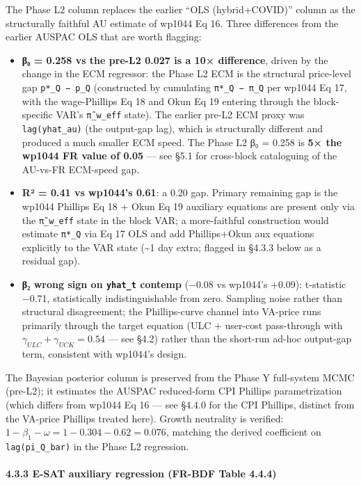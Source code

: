 \documentclass[
]{article}
\providecommand{\tightlist}{%
  \setlength{\itemsep}{0pt}\setlength{\parskip}{0pt}}
\begin{document}
The Phase L2 column replaces the earlier ``OLS (hybrid+COVID)'' column
as the structurally faithful AU estimate of wp1044 Eq 16. Three
differences from the earlier AUSPAC OLS that are worth flagging:

\begin{itemize}
\tightlist
\item
  \textbf{β₀ = 0.258 vs the pre-L2 0.027 is a 10× difference}, driven by
  the change in the ECM regressor: the Phase L2 ECM is the structural
  price-level gap \texttt{p*\_Q\ −\ p\_Q} (constructed by cumulating
  \texttt{π*\_Q\ −\ π\_Q} per wp1044 Eq 17, with the wage-Phillips Eq 18
  and Okun Eq 19 entering through the block-specific VAR's
  \texttt{π̃\_w\_eff} state). The earlier pre-L2 ECM proxy was
  \texttt{lag(yhat\_au)} (the output-gap lag), which is structurally
  different and produced a much smaller ECM speed. The Phase L2 β₀ =
  0.258 is \textbf{5× the wp1044 FR value of 0.05} --- see §5.1 for
  cross-block cataloguing of the AU-vs-FR ECM-speed gap.
\item
  \textbf{R² = 0.41 vs wp1044's 0.61}: a 0.20 gap. Primary remaining gap
  is the wp1044 Phillips Eq 18 + Okun Eq 19 auxiliary equations are
  present only via the \texttt{π̃\_w\_eff} state in the block VAR; a
  more-faithful construction would estimate \texttt{π*\_Q} via Eq 17 OLS
  and add Phillips+Okun aux equations explicitly to the VAR state
  (\textasciitilde1 day extra; flagged in §4.3.3 below as a residual
  gap).
\item
  \textbf{β₂ wrong sign on \texttt{yhat\_t} contemp} (−0.08 vs wp1044's
  +0.09): t-statistic −0.71, statistically indistinguishable from zero.
  Sampling noise rather than structural disagreement; the Phillips-curve
  channel into VA-price runs primarily through the target equation (ULC
  + user-cost pass-through with \(\gamma_{ULC} + \gamma_{UCK} = 0.54\)
  --- see §4.2) rather than the short-run ad-hoc output-gap term,
  consistent with wp1044's design.
\end{itemize}

The Bayesian posterior column is preserved from the Phase Y full-system
MCMC (pre-L2); it estimates the AUSPAC reduced-form CPI Phillips
parametrization (which differs from wp1044 Eq 16 --- see §4.4.0 for the
CPI Phillips, distinct from the VA-price Phillips treated here). Growth
neutrality is verified:
\(1 - \beta_1 - \omega = 1 - 0.304 - 0.62 = 0.076\), matching the
derived coefficient on \texttt{lag(pi\_Q\_bar)} in the Phase L2
regression.

\paragraph{4.3.3 E-SAT auxiliary regression (FR-BDF Table
4.4.4)}\label{e-sat-auxiliary-regression-fr-bdf-table-4.4.4}
\end{document}
